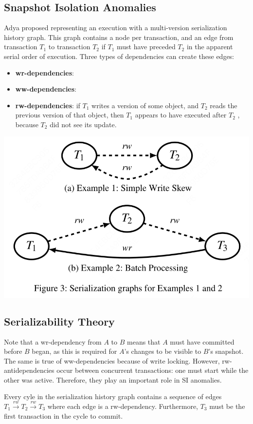 \documentclass[11pt]{article}
\begin{document}
\subsection{Snapshot Isolation Anomalies}
\label{sec:org0743ec4}
Adya proposed representing an execution with a multi-version serialization history graph. This graph
contains a node per transaction, and an edge from transaction \(T_1\) to transaction \(T_2\) if
\(T_1\) must have preceded \(T_2\) in the apparent serial order of execution. Three types of
dependencies can create these edges:
\begin{itemize}
\item \textbf{wr-dependencies}:
\item \textbf{ww-dependencies}:
\item \textbf{rw-dependencies}: if \(T_1\) writes a version of some object, and \(T_2\) reads the previous version
of that object, then \(T_1\) appears to have executed after \(T_2\) , because \(T_2\) did not see its update.
\end{itemize}


\begin{center}
\includegraphics[width=.5\textwidth]{../../images/papers/75.png}
\label{3}
\end{center}
\subsection{Serializability Theory}
\label{sec:orge877114}
Note that a wr-dependency from \(A\) to \(B\) means that \(A\) must have committed before  \(B\)
began, as this is required for \(A\)’s changes to be visible to \(B\)’s snapshot. The same is true of
ww-dependencies because of write locking. However, rw-antidependencies occur between concurrent
transactions: one must start while the other was active. Therefore, they play an important role in SI
anomalies.

\begin{theorem}[]
\label{thm1}
Every cyle in the serialization history graph contains a sequence of edges
\(T_1\xrightarrow{rw}T_2\xrightarrow{rw}T_3\) where each edge is a rw-dependency. Furthermore, \(T_3\)
must be the first transaction in the cycle to commit.
\end{theorem}
\end{document}
